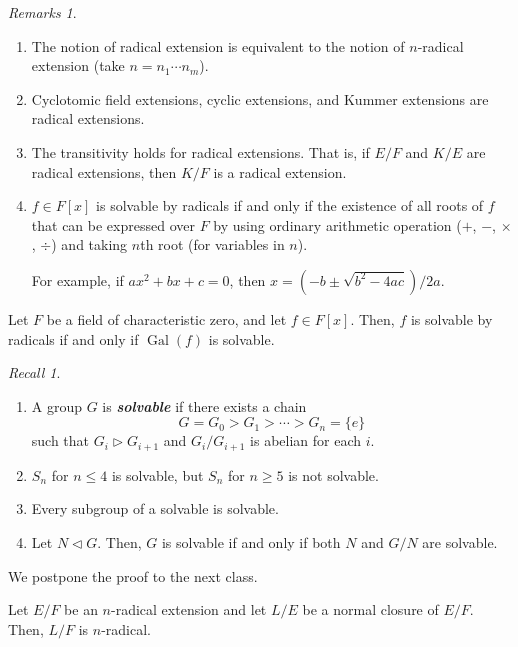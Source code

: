 \documentclass[twoside]{article}
\DeclareMathOperator\Gal{Gal}
\theoremstyle{remark}
\newtheorem*{remarks}{{Remarks}}
\newtheorem*{recall}{Recall}
\newcounter{theorem}
\newcommand*\term[1]{\textbf{\textit{\mathversion{bold}#1}}}
\begin{document}
\begin{remarks}
  \begin{enumerate}
    \item The notion of radical extension is equivalent to the notion of \(n\)-radical extension (take \(n = n_1 \cdots n_m\)).
    \item Cyclotomic field extensions, cyclic extensions, and Kummer extensions are radical extensions.
    \item The transitivity holds for radical extensions. That is, if \(E/F\) and \(K/E\) are radical extensions, then \(K/F\) is a radical extension.
    \item \(f \in F[x]\) is solvable by radicals if and only if the existence of all roots of \(f\) that can be expressed over \(F\) by using ordinary arithmetic operation (\(+\), \(-\), \(\times\), \(\div\)) and taking \(n\)th root (for variables in \(n\)). \par
    For example, if \(ax^2+bx+c=0\), then \(x = (-b \pm \sqrt{b^2 - 4ac})/2a\).
  \end{enumerate}
\end{remarks}

\begin{theorem}[Galois]
  Let \(F\) be a field of characteristic zero, and let \(f \in F[x]\). Then, \(f\) is solvable by radicals if and only if \(\Gal(f)\) is solvable.
\end{theorem}

\begin{recall}
  \begin{enumerate}
    \item A group \(G\) is \term{solvable} if there exists a chain
    \[ G = G_0 > G_1 > \cdots > G_n = \{e\} \]
    such that \(G_i \vartriangleright G_{i+1}\) and \(G_i/G_{i+1}\) is abelian for each \(i\).
    \item \(S_n\) for \(n \leq 4\) is solvable, but \(S_n\) for \(n \geq 5\) is not solvable.
    \item Every subgroup of a solvable is solvable.
    \item Let \(N \vartriangleleft G\). Then, \(G\) is solvable if and only if both \(N\) and \(G/N\) are solvable.
  \end{enumerate}
\end{recall}

We postpone the proof to the next class.

\begin{lemma}
  Let \(E/F\) be an \(n\)-radical extension and let \(L/E\) be a normal closure of \(E/F\). Then, \(L/F\) is \(n\)-radical.
\end{lemma}
\end{document}
